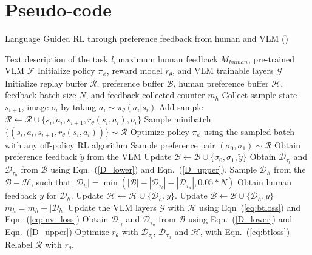 \newpage
\appendix
\onecolumn
\section{Pseudo-code}
\label{app:pseudocode}
\begin{algorithm}[ht]
\caption{Language Guided RL through preference feedback from human and VLM (\algo)}\label{alg:guiderl}
\begin{algorithmic}[1]
\REQUIRE Text description of the task \textit{l}, maximum human feedback $M_{human}$, pre-trained VLM $\mathcal{F}$
\STATE Initialize policy $\pi_\phi$, reward model $r_\theta$, and VLM trainable layers $\mathcal{G}$
\STATE Initialize replay buffer $\mathcal{R}$, preference buffer $\mathcal{B}$, human preference buffer $\mathcal{H}$, feedback batch size $N$, and feedback collected counter $m_h$
\STATE Collect sample state $s_{i+1}$, image $o_{i}$ by taking $a_i \sim \pi_\theta(a_i|s_i)$
\STATE Add sample $\mathcal{R} \longleftarrow \mathcal{R} \cup \{s_i, a_i, s_{i+1}, r_\theta(s_i, a_i), o_i\}$
\STATE Sample  minibatch $\{(s_i, a_i, s_{i+1}, r_\theta(s_i, a_i))\} \sim \mathcal{R}$
\STATE Optimize policy $\pi_\phi$ using the sampled batch with any off-policy RL algorithm 
\ENDFOR
{}
\STATE Sample preference pair $(\sigma_0, \sigma_1)\sim\mathcal{R}$
\STATE Obtain preference feedback $\tilde{y}$ from the VLM
\STATE Update $\mathcal{B} \longleftarrow \mathcal{B} \cup \{\sigma_0, \sigma_1, \tilde{y}\}$
\ENDFOR
{}
\STATE Obtain $\mathcal{D}_{\tau_l}$ and $\mathcal{D}_{\tau_u}$ from $\mathcal{B}$ using Eqn.~(\ref{D_lower}) and Eqn.~(\ref{D_upper}).
\STATE Sample $\mathcal{D}_h$ from the $\mathcal{B} - \mathcal{H}$, such that $|\mathcal{D}_h| = \min(|\mathcal{B}| - |\mathcal{D}_{\tau_l}| - |\mathcal{D}_{\tau_u}|, 0.05*N)$ 
\STATE Obtain human feedback $y$ for $\mathcal{D}_h$.
\STATE Update $\mathcal{H} \longleftarrow \mathcal{H} \cup \{\mathcal{D}_h, y\}$.
\STATE Update $\mathcal{B} \longleftarrow \mathcal{B} \cup \{\mathcal{D}_h, y\}$
\STATE $m_h = m_h + |\mathcal{D}_h|$
\STATE Update the VLM layers $\mathcal{G}$ with $\mathcal{H}$ using Eqn~(\ref{eq:btloss}) and Eqn.~(\ref{eq:inv_loss})
\ENDFOR
\ENDIF
{}
\STATE Obtain $\mathcal{D}_{\tau_l}$ and $\mathcal{D}_{\tau_u}$ from $\mathcal{B}$ using Eqn.~(\ref{D_lower}) and Eqn.~(\ref{D_upper})
\STATE Optimize $r_\theta$ with $\mathcal{D}_{\tau_l}$, $\mathcal{D}_{\tau_u}$ and $\mathcal{H}$, with Eqn.~(\ref{eq:btloss}) 
\ENDFOR
\STATE Relabel $\mathcal{R}$ with $r_\theta$.
\ENDIF

\ENDFOR
\end{algorithmic}  
\label{alg:prefvlm}
\end{algorithm}

